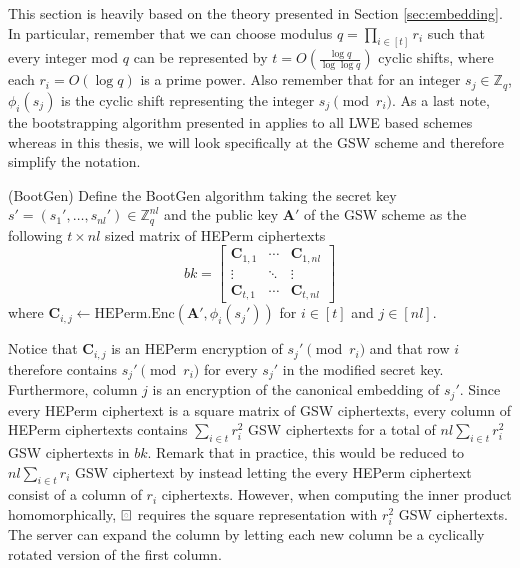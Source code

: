 This section is heavily based on the theory presented in Section \ref{sec:embedding}. In particular, remember that we can choose modulus $q = \prod\limits_{i \in [t]}r_i$ such that every integer mod $q$ can be represented by $t = O(\frac{\log q}{\log \log q})$ cyclic shifts, where each $r_i = O(\log q)$ is a prime power. Also remember that for an integer $s_j \in \mathbb{Z}_q$, $\phi_i(s_j)$ is the cyclic shift representing the integer $s_j \pmod {r_i}$. As a last note, the bootstrapping algorithm presented in \cite{A-S-P-boot} applies to all LWE based schemes whereas in this thesis, we will look specifically at the GSW scheme and therefore simplify the notation.

\begin{definition}(BootGen)
    Define the BootGen algorithm taking the secret key $s' = (s_1', \dots, s_{nl}') \in \mathbb{Z}_q^{nl}$ and the public key $\mathbf{A}'$ of the GSW scheme as the following $t \times nl$ sized matrix of HEPerm ciphertexts
    \begin{equation}\label{bk}
        bk =
        \left[
        \begin{array}{ccc}
            \mathbf{C}_{1,1} & \cdots & \mathbf{C}_{1,nl} \\
            \vdots & \ddots  & \vdots\\
            \mathbf{C}_{t,1}  & \cdots & \mathbf{C}_{t,nl} 
        \end{array}
        \right]
    \end{equation}
    where $\mathbf{C}_{i,j} \leftarrow \text{HEPerm.Enc}(\mathbf{A}', \phi_i(s_j'))$ for $i \in [t]$ and $j \in [nl]$.
\end{definition}
Notice that $\mathbf{C}_{i,j}$ is an HEPerm encryption of $s_j' \pmod {r_i}$ and that row $i$ therefore contains $s_j' \pmod {r_i}$ for every $s_j'$ in the modified secret key. Furthermore, column $j$ is an encryption of the canonical embedding of $s_j'$. Since every HEPerm ciphertext is a square matrix of GSW ciphertexts, every column of HEPerm ciphertexts contains $\sum\limits_{i \in t} r_i^2$ GSW ciphertexts for a total of $nl \sum\limits_{i \in t} r_i^2$ GSW ciphertexts in $bk$. Remark that in practice, this would be reduced to $nl \sum\limits_{i \in t} r_i$ GSW ciphertext by instead letting the every HEPerm ciphertext consist of a column of $r_i$ ciphertexts. However, when computing the inner product homomorphically, $\boxring$ requires the square representation with $r_i^2$ GSW ciphertexts. The server can expand the column by letting each new column be a cyclically rotated version of the first column. 
